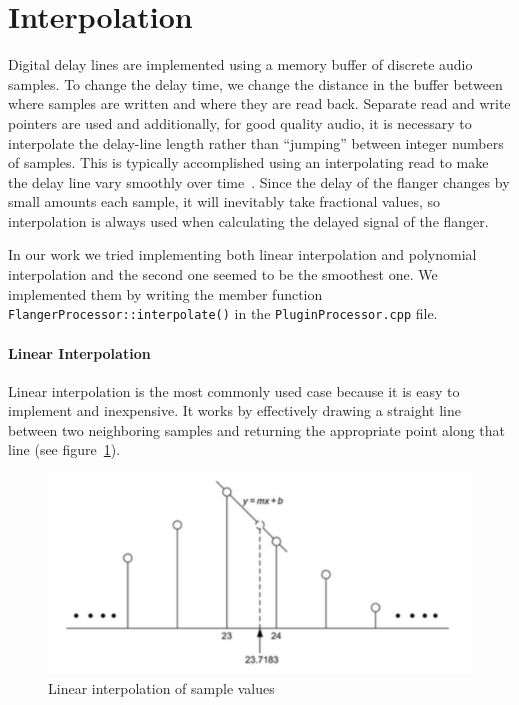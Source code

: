 \section{Interpolation}\label{sec:interpolation}

Digital delay lines are implemented using a memory buffer of discrete audio samples. To change the delay time, we change the distance in the buffer between where samples are written and where they are read back.\cite{reiss2014audio}
Separate read and write pointers are used and additionally, for good quality audio, it is necessary to interpolate the delay-line length rather than ``jumping'' between integer numbers of samples. This is typically accomplished using an interpolating read to make the delay line vary smoothly over time~\cite{smith2010physical}.
Since the delay of the flanger changes by small amounts each sample, it will inevitably take fractional values, so interpolation is always used when calculating the delayed signal of the flanger.

In our work we tried implementing both linear interpolation and polynomial interpolation and the second one seemed to be the smoothest one.
We implemented them by writing the member function \texttt{FlangerProcessor::interpolate()} in the \texttt{PluginProcessor.cpp} file.

\paragraph{Linear Interpolation}
Linear interpolation is the most commonly used case because it is easy to implement and inexpensive.
It works by effectively drawing a straight line between two neighboring samples and returning the appropriate point along that line (see figure~\ref{fig:linear-interpolation}).
  
\begin{figure}[h]
	\centering
  	\includegraphics[width=0.8\linewidth]{assets/Linear interpolation of sample values.png}
  	\caption{Linear interpolation of sample values}
  	\label{fig:linear-interpolation}
\end{figure}


